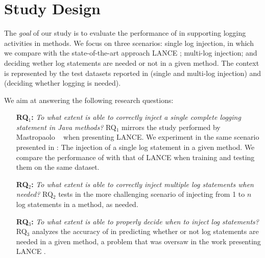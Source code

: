 \section{Study Design} \label{sec:design}

The \emph{goal} of our study is to evaluate the performance of \approach in supporting logging activities in \java methods. We focus on three scenarios: single log injection, in which we compare with the state-of-the-art approach LANCE \cite{mastropaolo2022using}; multi-log injection; and deciding wether log statements are needed or not in a given \java method. The context is represented by the test datasets reported in  (single and multi-log injection) and  (deciding whether logging is needed).

We aim at answering the following research questions:

\begin{itemize}[itemindent=0.3cm]

\item[\textbf{RQ$_1$:}]\textit{To what extent is \approach able to correctly inject a single complete logging statement in Java methods?} RQ$_1$ mirrors the study performed by Mastropaolo \etal~\cite{mastropaolo2022using} when presenting LANCE. We experiment \approach in the same scenario presented in \cite{mastropaolo2022using}: The injection of a single log statement in a given \java method. We compare the performance of \approach with that of LANCE when training and testing them on the same dataset. 

\item[\textbf{RQ$_2$:}]\textit{To what extent is \approach able to correctly inject multiple log statements when needed?} RQ$_2$ tests \approach in the more challenging scenario of injecting from 1 to $n$ log statements in a \java method, as needed.

\item[\textbf{RQ$_3$:}]\textit{To what extent is \approach able to properly decide when to inject log statements?} RQ$_3$ analyzes the accuracy of \approach in predicting whether or not log statements are needed in a given \java method, a problem that was oversaw in the work presenting LANCE \cite{mastropaolo2022using}.

\end{itemize}

